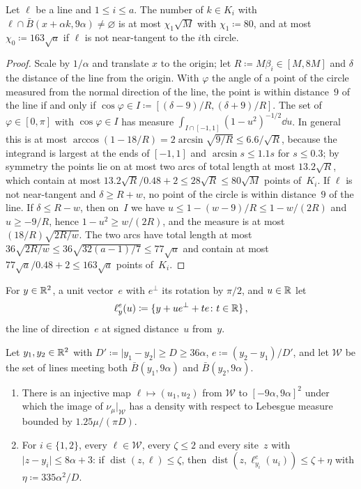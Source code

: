 \documentclass[11pt,letterpaper]{article}
\DeclareMathOperator{\dist}{dist}
\newcommand{\cW}{\mathcal W}
\begin{document}
\begin{lemma}
\label{sub:lem:chord}
Let $\ell$ be a line and $1\le i\le a$. The number of $k\in K_i$ with $\ell\cap \bar B(x+\alpha k,9\alpha)\neq\varnothing$ is at most $\chi_1\sqrt M$ with $\chi_1\coloneqq80$, and at most $\chi_0\coloneqq163\sqrt a$ if $\ell$ is not near-tangent to the $i$th circle.
\end{lemma}

\begin{proof}
Scale by $1/\alpha$ and translate $x$ to the origin; let $R\coloneqq M\beta_i\in[M,8M]$ and $\delta$ the distance of the line from the origin. With $\varphi$ the angle of a point of the circle measured from the normal direction of the line, the point is within distance~$9$ of the line if and only if $\cos\varphi\in I\coloneqq[(\delta-9)/R,(\delta+9)/R]$. The set of $\varphi\in[0,\pi]$ with $\cos\varphi\in I$ has measure $\int_{I\cap[-1,1]}(1-u^2)^{-1/2}\dd u$. In general this is at most $\arccos(1-18/R)=2\arcsin\sqrt{9/R}\le6.6/\sqrt R$, because the integrand is largest at the ends of $[-1,1]$ and $\arcsin s\le1.1s$ for $s\le0.3$; by symmetry the points lie on at most two arcs of total length at most $13.2\sqrt R$, which contain at most $13.2\sqrt R/0.48+2\le28\sqrt R\le80\sqrt M$ points of~$K_i$. If $\ell$ is not near-tangent and $\delta\ge R+w$, no point of the circle is within distance~$9$ of the line. If $\delta\le R-w$, then on~$I$ we have $u\le1-(w-9)/R\le1-w/(2R)$ and $u\ge-9/R$, hence $1-u^2\ge w/(2R)$, and the measure is at most $(18/R)\sqrt{2R/w}$. The two arcs have total length at most $36\sqrt{2R/w}\le36\sqrt{32(a-1)/7}\le77\sqrt a$ and contain at most $77\sqrt a/0.48+2\le163\sqrt a$ points of~$K_i$.
\end{proof}

For $y\in\mathbb R^2$, a unit vector~$e$ with $e^\perp$ its rotation by $\pi/2$, and $u\in\mathbb R$ let
\begin{equation*}
  \ell^{e}_{y}(u)\coloneqq\{y+ue^\perp+te\colon t\in\mathbb R\}\,,
\end{equation*}
the line of direction~$e$ at signed distance~$u$ from~$y$.

\begin{lemma}
\label{sub:lem:pair}
Let $y_1,y_2\in\mathbb R^2$ with $D'\coloneqq\lvert y_1-y_2\rvert\ge D\ge36\alpha$, $e\coloneqq(y_2-y_1)/D'$, and let $\cW$ be the set of lines meeting both $\bar B(y_1,9\alpha)$ and $\bar B(y_2,9\alpha)$.
\begin{enumerate}
  \item There is an injective map $\ell\mapsto(u_1,u_2)$ from $\cW$ to $[-9\alpha,9\alpha]^2$ under which the image of $\nu_\mu\vert_{\cW}$ has a density with respect to Lebesgue measure bounded by $1.25\mu/(\pi D)$.
  \item For $i\in\{1,2\}$, every $\ell\in\cW$, every $\zeta\le2$ and every site~$z$ with $\lvert z-y_i\rvert\le8\alpha+3$: if $\dist(z,\ell)\le\zeta$, then $\dist(z,\ell^e_{y_i}(u_i))\le\zeta+\eta$ with $\eta\coloneqq335\alpha^2/D$.
\end{enumerate}
\end{lemma}
\end{document}
